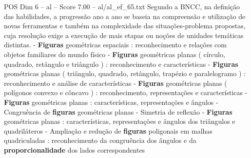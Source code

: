 \begin{textsample}{POS Dim 6 – al – Score 7.00 – al/al\_ef\_65.txt}
Segundo a BNCC, na definição das habilidades, a progressão ano a ano se baseia na compreensão e utilização de novas ferramentas e também na complexidade das situações-problema propostas, cuja resolução exige a execução de mais etapas ou noções de unidades temáticas distintas. - \textbf{Figuras} geométricas espaciais : reconhecimento e relações com objetos familiares do mundo físico - \textbf{Figuras} geométricas planas ( círculo, quadrado, retângulo e triângulo ) : reconhecimento e características - \textbf{Figuras} geométricas planas ( triângulo, quadrado, retângulo, trapézio e paralelogramo ) : reconhecimento e análise de características - \textbf{Figuras} geométricas planas ( polígonos convexo e côncavo ) : reconhecimento, representações e características - \textbf{Figuras} geométricas planas : características, representações e ângulos - Congruência de \textbf{figuras} geométricas planas - Simetria de reflexão - \textbf{Figuras} geométricas planas : características, representações e ângulos dos triângulos e quadriláteros - Ampliação e redução de \textbf{figuras} poligonais em malhas quadriculadas : reconhecimento da congruência dos ângulos e da \textbf{proporcionalidade} dos lados correspondentes

\end{textsample}
